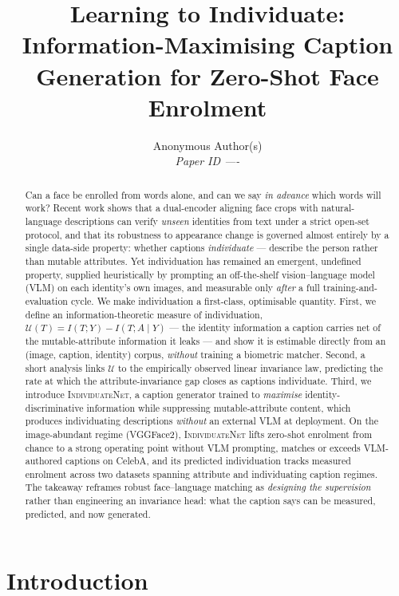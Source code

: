\documentclass[10pt,twocolumn,letterpaper]{article}
\title{\textbf{Learning to Individuate: Information-Maximising Caption\\
Generation for Zero-Shot Face Enrolment}}
\author{Anonymous Author(s)\\ \textit{Paper ID ----}}
\date{}
\newcommand{\U}{\mathcal{U}}
\newcommand{\method}{\textsc{IndividuateNet}}
\begin{document}
\maketitle

\begin{abstract}
Can a face be enrolled from words alone, and can we say \emph{in advance} which words will
work? Recent work shows that a dual-encoder aligning face crops with natural-language
descriptions can verify \emph{unseen} identities from text under a strict open-set protocol,
and that its robustness to appearance change is governed almost entirely by a single data-side
property: whether captions \emph{individuate} --- describe the person rather than mutable
attributes. Yet individuation has remained an emergent, undefined property, supplied
heuristically by prompting an off-the-shelf vision--language model (VLM) on each identity's own
images, and measurable only \emph{after} a full training-and-evaluation cycle. We make
individuation a first-class, optimisable quantity. First, we define an information-theoretic
measure of individuation, $\U(T)=I(T;Y)-I(T;A\mid Y)$ --- the identity information a caption
carries net of the mutable-attribute information it leaks --- and show it is estimable directly
from an (image, caption, identity) corpus, \emph{without} training a biometric matcher. Second,
a short analysis links $\U$ to the empirically observed linear invariance law, predicting the
rate at which the attribute-invariance gap closes as captions individuate. Third, we introduce
\method, a caption generator trained to \emph{maximise} identity-discriminative information
while suppressing mutable-attribute content, which produces individuating descriptions
\emph{without} an external VLM at deployment. On the image-abundant regime (VGGFace2), \method{}
lifts zero-shot enrolment from chance to a strong operating point without VLM prompting, matches
or exceeds VLM-authored captions on CelebA, and its predicted individuation tracks measured
enrolment across two datasets spanning attribute and individuating caption regimes. The takeaway reframes robust face--language matching as \emph{designing the
supervision} rather than engineering an invariance head: what the caption says can be measured,
predicted, and now generated.
\end{abstract}

\section{Introduction}
\end{document}
